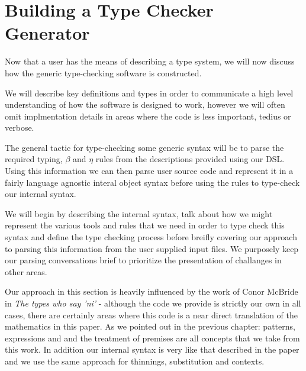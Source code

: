 \chapter{Building a Type Checker Generator}

Now that a user has the means of describing a type system, we will now
discuss how the generic type-checking software is constructed.

We will describe key definitions and types in order to communicate a
high level understanding of how the software is designed to work,
however we will often omit implmentation details in areas where the
code is less important, tedius or verbose.

The general tactic for type-checking some generic syntax will be to
parse the required typing, $\beta$ and $\eta$ rules from the
descriptions provided using our DSL. Using this information we can
then parse user source code and represent it in a fairly language
agnostic interal object syntax before using the rules to type-check
our internal syntax.

We will begin by describing the internal syntax, talk about how we
might represent the various tools and rules that we need in order to
type check this syntax and define the type checking process before
breifly covering our approach to parsing this information from the
user supplied input files. We purposely keep our parsing conversations
brief to prioritize the presentation of challanges in other areas.

Our approach in this section is heavily influenced by the work of
Conor McBride in \emph{The types who say 'ni'} \cite{TypesWhoSayNi} -
although the code we provide is strictly our own in all cases, there
are certainly areas where this code is a near direct translation of
the mathematics in this paper. As we pointed out in the previous
chapter: patterns, expressions and and the treatment of premises are
all concepts that we take from this work. In addition our internal
syntax is very like that described in the paper and we use the same
approach for thinnings, substitution and contexts.

\\\\
















